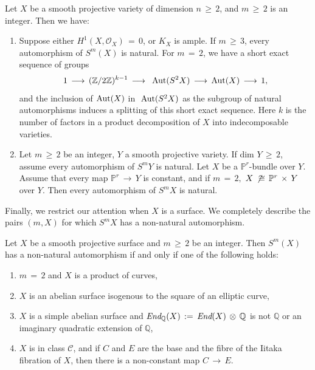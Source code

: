 \documentclass[12pt,reqno]{amsart}
\newenvironment{manualtheorem}[1]{%
\renewcommand\themanualtheoreminner{#1}%
  \manualtheoreminner
}{\endmanualtheoreminner}
\theoremstyle{definition}
\numberwithin{equation}{section}
\begin{document}
\begin{manualtheorem}{C}\label{3}
 Let $X$ be a smooth projective variety of dimension $n\, \geq\, 2$, and $m\,\geq\,2$ is an integer. Then we have:
 
\begin{enumerate}
\item[(i)] Suppose either $H^{1}(X, \mathcal{O}_{X})\, =\,0$, or $K_X$ is ample. If $m\,\geq\, 3$, every automorphism of $S^{m}(X)$ is natural. For $m\,=\,2$, we have a short exact sequence of groups $$1\,\longrightarrow\, (\mathbb{Z}/2\mathbb{Z})^{k-1}\,\longrightarrow\, \textnormal{ Aut} (S^2X)\,\longrightarrow\, \textnormal{Aut} (X)\,\longrightarrow \,1,$$ and the inclusion of $\textnormal{Aut} (X)$ in $\textnormal{ Aut} (S^2X)$ as the subgroup of natural automorphisms induces a splitting of this short exact sequence. Here $k$ is the number of factors in a product decomposition of $X$ into indecomposable varieties.
\item [(ii)] Let $m\,\geq\,2$ be an integer, $Y$ a smooth projective variety. If dim $Y\,\geq\, 2$, assume every automorphism of $S^mY$ is natural. Let $X$ be a $\mathbb{P}^r$-bundle over $Y$. Assume that every map $\mathbb{P}^r\,\to\, Y$ is constant, and if $m\,=\,2,$ $X\,\not\,\cong\, \mathbb{P}^r\,\times\, Y $ over $Y$. Then every automorphism of $S^m X$ is natural.
\end{enumerate}
\end{manualtheorem}

Finally, we restrict our attention when $X$ is a surface. We completely describe the pairs $(m,X)$ for which $S^mX$ has a non-natural automorphism.

\begin{manualtheorem}{D}\label{4}
Let $X$ be a smooth projective surface and $m\,\geq\, 2$ be an integer. Then $S^m(X)$ has a non-natural automorphism if and only if one of the following holds:
\begin{enumerate}
\item $m\,=\,2$ and $X$ is a product of curves,
\item $X$ is an abelian surface isogenous to the square of an elliptic curve,
\item $X$ is a simple abelian surface and $\emph{End}_{\mathbb{Q}}(X)\,:=\,\emph{End}(X)\,\otimes\, \mathbb{Q}$ is not $\mathbb{Q}$ or an imaginary quadratic extension of $\mathbb{Q}$,
\item $X$ is in class $\mathcal{C}$, and if $C$ and $E$ are the base and the fibre of the Iitaka fibration of $X$, then there is a non-constant map $C\,\to\, E.$
\end{enumerate}
\end{manualtheorem}
\end{document}

